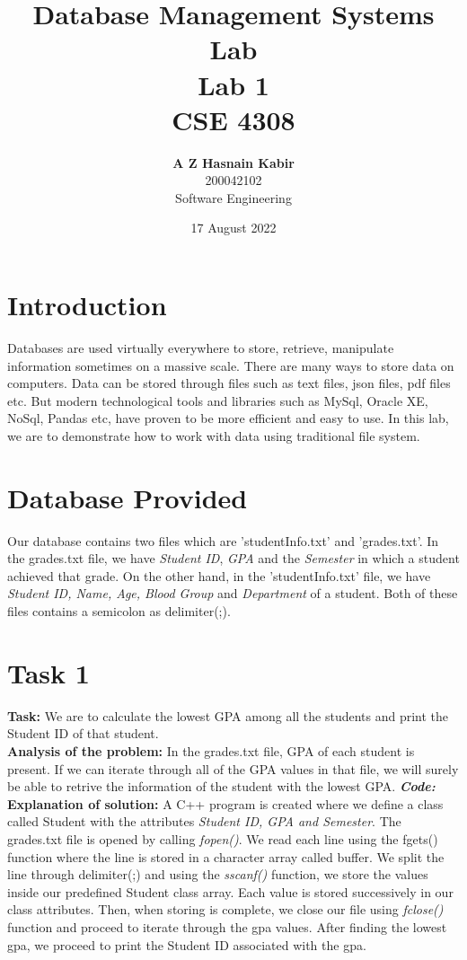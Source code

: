 \documentclass[a4paper, left=1in, right=1in,12pt]{article}
\title{Database Management Systems Lab\\Lab 1\\CSE 4308}
\author{\textbf{\Large A Z Hasnain Kabir}\\\Large 200042102\\\Large Software Engineering}
\date{17 August 2022}
\begin{document}
\maketitle

\section*{\large Introduction}
Databases are used virtually everywhere to store, retrieve, manipulate information sometimes on a massive scale. There are many ways to store data on computers. Data can be stored through files such as text files, json files, pdf files etc. But modern technological tools and libraries such as MySql, Oracle XE, NoSql, Pandas etc, have proven to be more efficient and easy to use. In this lab, we are to demonstrate how to work with data using traditional file system.
\section*{\large Database Provided}
Our database contains two files which are 'studentInfo.txt' and 'grades.txt'. In the grades.txt file, we have \textit{Student ID}, \textit{GPA} and the \textit{Semester} in which a student achieved that grade. On the other hand, in the 'studentInfo.txt' file, we have \textit{Student ID, Name, Age, Blood Group} and \textit{Department} of a student. Both of these files contains a semicolon as delimiter(;). 
\section*{Task 1}
\textbf{Task: }We are to calculate the lowest GPA among all the students and print the Student ID of that student.\\
\textbf{Analysis of the problem: }In the grades.txt file, GPA of each student is present. If we can iterate through all of the GPA values in that file, we will surely be able to retrive the information of the student with the lowest GPA.\newline\newline
\textbf{\textit{\large Code:}}\newline
\textbf{Explanation of solution: }A C++ program is created where we define a class called Student with the attributes \textit{Student ID, GPA and Semester}. The grades.txt file is opened by calling \textit{fopen()}. We read each line using the fgets() function where the line is stored in a character array called buffer. We split the line through delimiter(;)  and using the \textit{sscanf()} function, we store the values inside our predefined Student class array. Each value is stored successively in our class attributes.
Then, when storing is complete, we close our file using \textit{fclose()} function and proceed to iterate through the gpa values. After finding the lowest gpa, we proceed to print the Student ID associated with the gpa.
\end{document}
